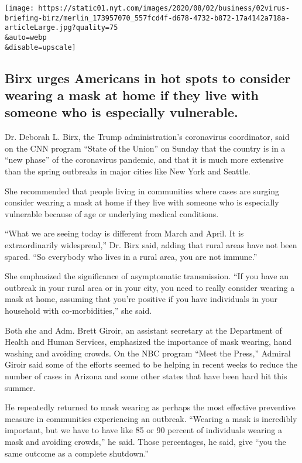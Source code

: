 \texttt{[image: https://static01.nyt.com/images/2020/08/02/business/02virus-briefing-birz/merlin\_173957070\_557fcd4f-d678-4732-b872-17a4142a718a-articleLarge.jpg?quality=75\\\&auto=webp\\\&disable=upscale]}

\hypertarget{birx-urges-americans-in-hot-spots-to-consider-wearing-a-mask-at-home-if-they-live-with-someone-who-is-especially-vulnerable}{%
\subsection{Birx urges Americans in hot spots to consider wearing a mask
at home if they live with someone who is especially
vulnerable.}\label{birx-urges-americans-in-hot-spots-to-consider-wearing-a-mask-at-home-if-they-live-with-someone-who-is-especially-vulnerable}}

Dr. Deborah L. Birx, the Trump administration's coronavirus coordinator,
said on the CNN program ``State of the Union'' on Sunday that the
country is in a ``new phase'' of the coronavirus pandemic, and that it
is much more extensive than the spring outbreaks in major cities like
New York and Seattle.

She recommended that people living in communities where cases are
surging consider wearing a mask at home if they live with someone who is
especially vulnerable because of age or underlying medical conditions.

``What we are seeing today is different from March and April. It is
extraordinarily widespread,'' Dr. Birx said, adding that rural areas
have not been spared. ``So everybody who lives in a rural area, you are
not immune.''

She emphasized the significance of asymptomatic transmission. ``If you
have an outbreak in your rural area or in your city, you need to really
consider wearing a mask at home, assuming that you're positive if you
have individuals in your household with co-morbidities,'' she said.

Both she and Adm. Brett Giroir, an assistant secretary at the Department
of Health and Human Services, emphasized the importance of mask wearing,
hand washing and avoiding crowds. On the NBC program ``Meet the Press,''
Admiral Giroir said some of the efforts seemed to be helping in recent
weeks to reduce the number of cases in Arizona and some other states
that have been hard hit this summer.

He repeatedly returned to mask wearing as perhaps the most effective
preventive measure in communities experiencing an outbreak. ``Wearing a
mask is incredibly important, but we have to have like 85 or 90 percent
of individuals wearing a mask and avoiding crowds,'' he said. Those
percentages, he said, give ``you the same outcome as a complete
shutdown.''

